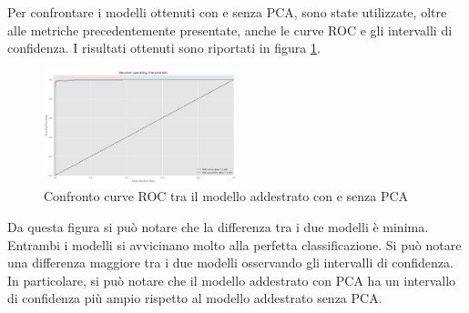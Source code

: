 Per confrontare i modelli ottenuti con e senza PCA, sono state utilizzate, oltre
alle metriche precedentemente presentate, anche le curve ROC e gli intervalli di
confidenza. I risultati ottenuti sono riportati in figura \ref{fig:confrontoRisultatiPCA}.

\begin{figure}[!ht]
    \centering
    \includegraphics[width=0.5\textwidth]{img/rete/confrontoRoc.png}
    \caption{Confronto curve ROC tra il modello addestrato con e senza PCA}
    \label{fig:confrontoRisultatiPCA}
\end{figure}

Da questa figura si può notare che la differenza tra i due modelli è minima.
Entrambi i modelli si avvicinano molto alla perfetta classificazione. Si può
notare una differenza maggiore tra i due modelli osservando gli intervalli di
confidenza. In particolare, si può notare che il modello addestrato con PCA ha
un intervallo di confidenza più ampio rispetto al modello addestrato senza PCA.

